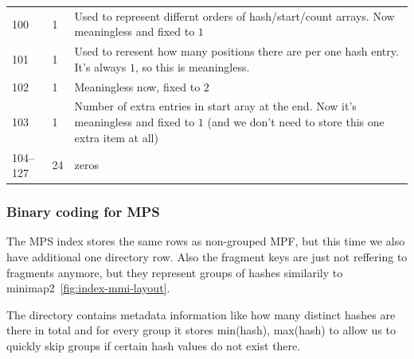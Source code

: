 \begin{table}[htbp]
\begin{tabularx}{\linewidth}{@{}llX@{}}
100 & 1 & Used to represent differnt orders of hash/start/count arrays. Now meaningless and fixed to $1$ \\
101 & 1 & Used to reresent how many positions there are per one hash entry. It's always $1$, so this is meaningless. \\
102 & 1 & Meaningless now, fixed to $2$ \\
103 & 1 & Number of extra entries in start aray at the end. Now it's meaningless and fixed to $1$ (and we don't need to store this one extra item at all)\\
104--127 & 24 & zeros\\
\bottomrule
\end{tabularx}
\label{tab:fields-in-grouped-mpf-directory-entry}
\end{table}

\subsubsection{Binary coding for MPS}

The MPS index stores the same rows as non-grouped MPF, but this time we also have additional one directory row.
Also the fragment keys are just not reffering to fragments anymore, but they represent groups of hashes similarily to minimap2~\ref{fig:index-mmi-layout}.

The directory contains metadata information like how many distinct hashes are there in total and for every group it stores min(hash), max(hash)
to allow us to quickly skip groups if certain hash values do not exist there.



